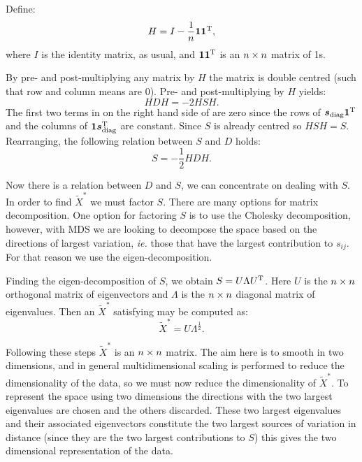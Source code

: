 Define:
\begin{equation}
H = I-\frac{1}{n}\bm{1}\bm{1}^{\text{T}},
\end{equation}
where $I$ is the identity matrix, as usual, and $\bm{1}\bm{1}^{\text{T}}$ is an $n \times n$ matrix of 1s.

By pre- and post-multiplying any matrix by $H$ the matrix is double centred (such that row and column means are 0). Pre- and post-multiplying  by $H$ yields:
\begin{equation}
HDH = -2HSH.
\end{equation}
The first two terms in on the right hand side of  are zero since the rows of $\bm{s}_\text{diag}\bm{1}^{\text{T}}$ and the columns of  $\bm{1}\bm{s}_\text{diag}^{\text{T}}$ are constant. Since $S$ is already centred so $HSH=S$. Rearranging, the following relation between $S$ and $D$ holds:
\begin{equation}
S = -\frac{1}{2}HDH.
\end{equation}

Now there is a relation between $D$ and $S$, we can concentrate on dealing with $S$. In order to find $\tilde{X}^{*}$ we must factor $S$. There are many options for matrix decomposition. One option for factoring $S$ is to use the Cholesky decomposition, however, with MDS we are looking to decompose the space based on the directions of largest variation, \emph{ie.} those that have the largest contribution to $s_{ij}$. For that reason we use the eigen-decomposition.

Finding the eigen-decomposition of $S$, we obtain $S=U\Lambda U^{\text{T}}$. Here $U$ is the $n \times n$ orthogonal matrix of eigenvectors and $\Lambda$ is the $n \times n$ diagonal matrix of eigenvalues. Then an $\tilde{X}^*$ satisfying  may be computed as:
\begin{equation}
\tilde{X}^*=U\Lambda^{\frac{1}{2}}.
\end{equation}

Following these steps $\tilde{X}^*$ is an $n \times n$ matrix. The aim here is to smooth in two dimensions, and in general multidimensional scaling is performed to reduce the dimensionality of the data, so we must now reduce the dimensionality of $\tilde{X}^*$. To represent the space using two dimensions the directions with the two largest eigenvalues are chosen and the others discarded. These two largest eigenvalues and their associated eigenvectors constitute the two largest sources of variation in distance (since they are the two largest contributions to $S$) this gives the two dimensional representation of the data. 

